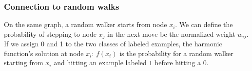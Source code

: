     \subsubsection*{Connection to random walks}

    On the same graph, a random walker starts from node $x_i$. We can define the
    probability of stepping to node $x_j$  in the next move be the normalized
    weight $w_{ij}$. If we assign 0 and 1 to the two classes
    of labeled examples, the harmonic function's solution at node $x_i$: $f(x_i)$
    is the probability for a random walker starting from $x_i$ and hitting an
    example labeled $1$ before hitting a $0$.

%
%









    
